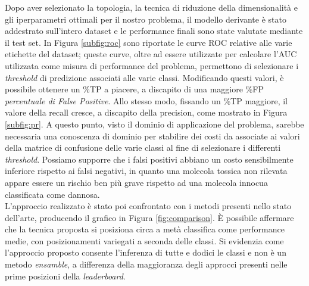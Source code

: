 Dopo aver selezionato la topologia, la tecnica di riduzione della dimensionalità e gli iperparametri ottimali per il nostro problema, il modello derivante è stato addestrato sull'intero dataset e le performance finali sono state valutate mediante il test set.
In Figura \ref{subfig:roc} sono riportate le curve ROC relative alle varie etichette del dataset; queste curve, oltre ad essere utilizzate per calcolare l'AUC utilizzata come misura di performance del problema, permettono di selezionare i \textit{threshold} di predizione associati alle varie classi. 
Modificando questi valori, è possibile ottenere un \%TP a piacere, a discapito di una maggiore \%FP \textit{percentuale di False Positive}. 
Allo stesso modo, fissando un \%TP maggiore, il valore della recall cresce, a discapito della precision, come mostrato in Figura \ref{subfig:pr}. 
A questo punto, visto il dominio di applicazione del problema, sarebbe necessaria una conoscenza di dominio per stabilire dei costi da associate ai valori della matrice di confusione delle varie classi al fine di selezionare i differenti \textit{threshold}. 
Possiamo supporre che i falsi positivi abbiano un costo sensibilmente inferiore rispetto ai falsi negativi, in quanto una molecola tossica non rilevata appare essere un rischio ben più grave rispetto ad una molecola innocua classificata come dannosa.\\
L'approccio realizzato è stato poi confrontato con i metodi presenti nello stato dell'arte, producendo il grafico in Figura \ref{fig:comparison}. È possibile affermare che la tecnica proposta si posiziona circa a metà classifica come performance medie, con posizionamenti variegati a seconda delle classi. Si evidenzia come l'approccio proposto consente l'inferenza di tutte e dodici le classi e non è un metodo \textit{ensamble}, a differenza della maggioranza degli approcci presenti nelle prime posizioni della \textit{leaderboard}.

